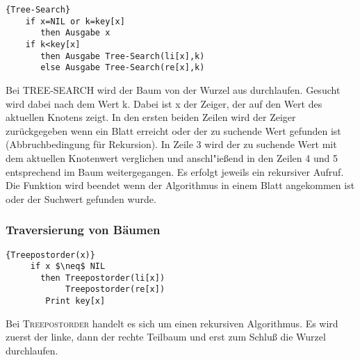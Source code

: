 \documentclass[ngerman,draft,parskip=half*,twoside]{scrreprt}
\theoremstyle{break}
\theoremstyle{nonumberbreak}
\begin{document}
  \begin{Algorithmus}[H]
    \begin{lstlisting}[frame=tlrb, mathescape=true, title=\textsc{Tree-Search}, gobble=4]{Tree-Search}
    if x=NIL or k=key[x]
       then Ausgabe x
    if k<key[x]
       then Ausgabe Tree-Search(li[x],k)
       else Ausgabe Tree-Search(re[x],k)
    \end{lstlisting}

    Bei \textsc{TREE-SEARCH} wird der Baum von der Wurzel aus durchlaufen. 
    Gesucht wird dabei nach dem Wert k. Dabei ist x der Zeiger, der auf den 
    Wert des aktuellen Knotens zeigt. In den ersten beiden Zeilen 
    wird der Zeiger zurückgegeben wenn ein Blatt erreicht oder der 
    zu suchende Wert gefunden ist (Abbruchbedingung für Rekursion). In 
    Zeile 3 wird der zu suchende Wert mit dem aktuellen Knotenwert 
    verglichen und anschl"ießend in den Zeilen 4 und 5 entsprechend im 
    Baum weitergegangen. Es erfolgt jeweils ein rekursiver Aufruf.\\
    Die Funktion wird beendet wenn der Algorithmus in einem Blatt 
    angekommen ist oder der Suchwert gefunden wurde.
    \end{Algorithmus}
 
 \subsubsection{Traversierung von Bäumen}
   \begin{Algorithmus}[H]
   \begin{lstlisting}[frame=tlrb, mathescape=true, title=\textsc{Treepostorder\textnormal{(x)}}, gobble=4]{Treepostorder(x)}
     if x $\neq$ NIL
       then Treepostorder(li[x])
            Treepostorder(re[x])
	    Print key[x]
    \end{lstlisting}

   Bei \textsc{Treepostorder} handelt es sich um einen rekursiven Algorithmus.
   Es wird zuerst der linke, dann der rechte Teilbaum und erst zum Schluß die Wurzel durchlaufen.
   \end{Algorithmus}
\end{document}

